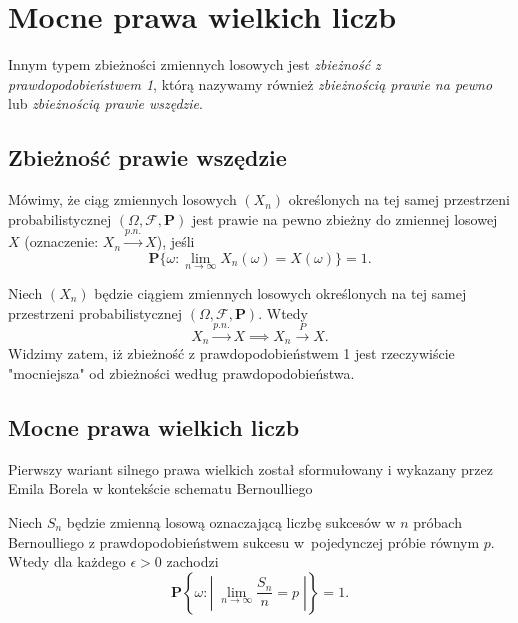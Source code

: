 \section{Mocne prawa wielkich liczb}
Innym typem zbieżności zmiennych losowych jest \textit{zbieżność z prawdopodobieństwem 1}, którą nazywamy również \textit{zbieżnością prawie na pewno} lub \textit{zbieżnością prawie wszędzie}.
\subsection{Zbieżność prawie wszędzie}
	\begin{df}
		Mówimy, że ciąg zmiennych losowych $(X_n)$ określonych na tej samej przestrzeni probabilistycznej $(\Omega, \mathcal{F}, \textbf{P})$ jest prawie na pewno zbieżny do zmiennej losowej $X$ (oznaczenie: $X_n \stackrel{p.n.}{\rightarrow} X$), jeśli 
		\begin{equation}
			\textbf{P} \{ \omega : \lim_{n\rightarrow \infty} X_n(\omega) = X(\omega) \} =1.
		\end{equation}
	\end{df}
	\begin{uwg}
		Niech $(X_n)$ będzie ciągiem zmiennych losowych określonych na tej samej przestrzeni probabilistycznej  $(\Omega, \mathcal{F}, \textbf{P})$. Wtedy
		\begin{equation*}
			X_n  \stackrel{p.n.}{\rightarrow} X \implies X_n  \stackrel{P}{\rightarrow} X.
		\end{equation*}
		Widzimy zatem, iż zbieżność z prawdopodobieństwem 1 jest rzeczywiście "mocniejsza" od zbieżności według prawdopodobieństwa.
	\end{uwg}

\subsection{Mocne prawa wielkich liczb}
Pierwszy wariant silnego prawa wielkich został sformułowany i wykazany przez Emila Borela w kontekście schematu Bernoulliego
	\begin{tw}
		Niech $S_n$ będzie zmienną losową oznaczającą liczbę sukcesów w $n$ próbach Bernoulliego z prawdopodobieństwem sukcesu w~pojedynczej próbie równym $p$. Wtedy dla każdego $\epsilon > 0$ zachodzi
		\begin{equation*}
			\textbf{P} \left\{ 
				\omega : 
					\left| \;
						\lim_{n \to \infty} \frac{S_n}{n} = p
					\; \right|
		\right\} = 1.
		\end{equation*}
	\end{tw}


